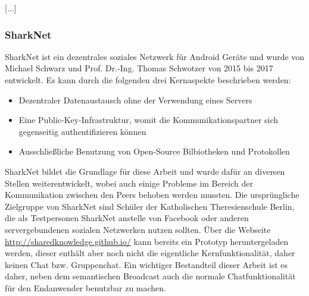 [...]

\subsubsection{SharkNet}

SharkNet ist ein dezentrales soziales Netzwerk für Android Geräte und wurde von Michael Schwarz und Prof. Dr.-Ing. Thomas Schwotzer von 2015 bis 2017 entwickelt. Es kann durch die folgenden drei Kernaspekte beschrieben werden:
\begin{itemize}
	\item Dezentraler Datenaustausch ohne der Verwendung eines Servers
	\item Eine Public-Key-Infrastruktur, womit die Kommunikationspartner sich gegenseitig authentifizieren können
	\item Ausschließliche Benutzung von Open-Source Bilbiotheken und Protokollen
\end{itemize}
SharkNet bildet die Grundlage für diese Arbeit und wurde dafür an diversen Stellen weiterentwickelt, wobei auch einige Probleme im Bereich der Kommunikation zwischen den Peers behoben werden mussten. Die ursprüngliche Zielgruppe von SharkNet sind Schüler der Katholischen Theresienschule Berlin, die als Testpersonen SharkNet anstelle von Facebook oder anderen servergebundenen sozialen Netzwerken nutzen sollten. Über die Webseite \url{http://sharedknowledge.github.io/} kann bereits ein Prototyp heruntergeladen werden, dieser enthält aber noch nicht die eigentliche Kernfunktionalität, daher keinen Chat bzw. Gruppenchat. Ein wichtiger Bestandteil dieser Arbeit ist es daher, neben dem semantischen Broadcast auch die normale Chatfunktionalität für den Endanwender benutzbar zu machen.  
\newline[...]
\newpage



